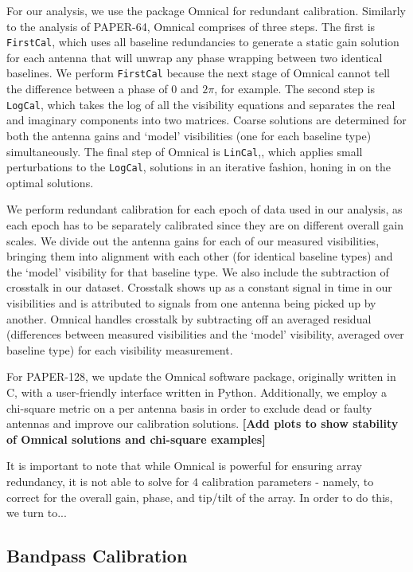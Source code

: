 \documentclass[preprint2,numberedappendix,tighten,twocolappendix]{aastex6}  %
\newcommand{\cc}[1]{{\color{purple} \textbf{[#1]}}}
\begin{document}
For our analysis, we use the package {\sc Omnical} for redundant calibration. Similarly to the analysis of PAPER-64, {\sc Omnical} comprises of three steps. The first is {\tt FirstCal}, which uses all baseline redundancies to generate a static gain solution for each antenna that will unwrap any phase wrapping between two identical baselines. We perform {\tt FirstCal} because the next stage of {\sc Omnical} cannot tell the difference between a phase of $0$ and $2\pi$, for example. The second step is {\tt LogCal}, which takes the log of all the visibility equations and separates the real and imaginary components into two matrices. Coarse solutions are determined for both the antenna gains and `model' visibilities (one for each baseline type) simultaneously. The final step of {\sc Omnical} is {\tt LinCal},, which applies small perturbations to the {\tt LogCal}, solutions in an iterative fashion, honing in on the optimal solutions.

We perform redundant calibration for each epoch of data used in our analysis, as each epoch has to be separately calibrated since they are on different overall gain scales. We divide out the antenna gains for each of our measured visibilities, bringing them into alignment with each other (for identical baseline types) and the `model' visibility for that baseline type. We also include the subtraction of crosstalk in our dataset. Crosstalk shows up as a constant signal in time in our visibilities and is attributed to signals from one antenna being picked up by another. {\sc Omnical} handles crosstalk by subtracting off an averaged residual (differences between measured visibilities and the `model' visibility, averaged over baseline type) for each visibility measurement.

For PAPER-128, we update the {\sc Omnical} software package, originally written in C, with a user-friendly interface written in Python.  Additionally, we employ a chi-square metric on a per antenna basis in order to exclude dead or faulty antennas and improve our calibration solutions. \cc{Add plots to show stability of {\sc Omnical} solutions and chi-square examples}
 
It is important to note that while {\sc Omnical} is powerful for ensuring array redundancy, it is not able to solve for $4$ calibration parameters - namely, to correct for the overall gain, phase, and tip/tilt of the array. In order to do this, we turn to...

\subsection{Bandpass Calibration}
\end{document}
